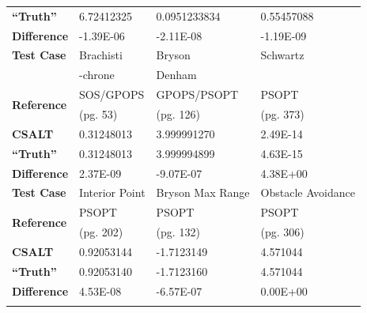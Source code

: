 \documentclass[ISTS  ]{tjsass} %
\newcommand{\bhline}[1]{\noalign{\hrule height #1}}
\begin{document}
\begin{table}
\begin{tabularx}{\columnwidth}{lXXX}
        \textbf{``Truth''}  & 6.72412325                   & 0.0951233834                          & 0.55457088              \\
        \textbf{Difference} & -1.39E-06                    & -2.11E-08                             & -1.19E-09               \\\bhline{.8pt}
        \textbf{Test Case}  & Brachisti                    & Bryson                                & Schwartz                \\
                            & -chrone                      & Denham                                &                         \\\hline
        \multirow{2}{*}{\textbf{Reference}} & SOS/GPOPS                    & GPOPS/PSOPT                           & PSOPT                   \\
                            & (pg. 53)                     & (pg. 126)                             & (pg. 373)               \\
        \textbf{CSALT}      & 0.31248013                   & 3.999991270                           & 2.49E-14                \\
        \textbf{``Truth''}  & 0.31248013                   & 3.999994899                           & 4.63E-15                \\
        \textbf{Difference} & 2.37E-09                     & -9.07E-07                             & 4.38E+00                \\\bhline{.8pt}
        \textbf{Test Case}  & Interior Point               & Bryson Max Range                      & Obstacle Avoidance      \\\hline
        \multirow{2}{*}{\textbf{Reference}} & PSOPT                        & PSOPT                                 & PSOPT                   \\
                            & (pg. 202)                    & (pg. 132)                             & (pg. 306)               \\
        \textbf{CSALT}      & 0.92053144                   & -1.7123149                            & 4.571044                \\
        \textbf{``Truth''}  & 0.92053140                   & -1.7123160                            & 4.571044                \\
        \textbf{Difference} & 4.53E-08                     & -6.57E-07                             & 0.00E+00                \\\bhline{.8pt}

\end{tabularx}
\end{table}
\end{document}

